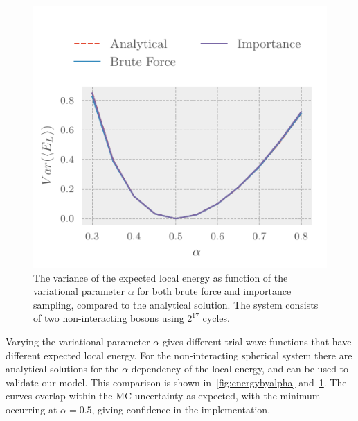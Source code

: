 \begin{figure}[ht]
  \centering
  \includegraphics[]{figures/variance_importance1.pdf}
  \caption{\label{fig:variancebyalpha} The variance of the expected local energy as function of
    the variational parameter \(\alpha\) for both brute force and importance
    sampling, compared to the analytical solution. The system consists of two
    non-interacting bosons using \(2^{17}\) cycles.}
\end{figure}

Varying the variational parameter \(\alpha\) gives different trial wave
functions that have different expected local energy. For the non-interacting
spherical system there are analytical solutions for the \(\alpha\)-dependency of
the
local energy, and can be used to validate our model. This comparison is shown
in~\cref{fig:energybyalpha} and~\cref{fig:variancebyalpha}. The curves overlap
within the MC-uncertainty as expected, with the minimum occurring at
\(\alpha=0.5\), giving confidence in the implementation.

